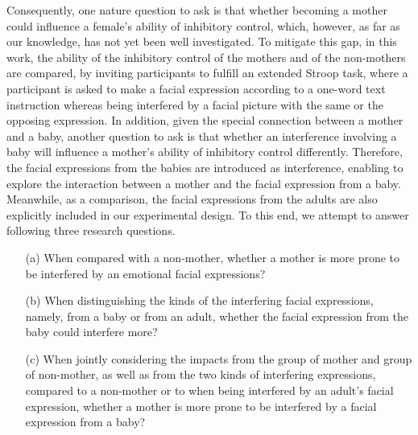 Consequently, 
one nature question to ask is that 
whether becoming a mother
could influence a female's ability of inhibitory
control, which, however, as far as our knowledge,
has not yet been well investigated.
To mitigate this gap,
in this work,
the ability of the inhibitory control of the mothers 
and of the non-mothers are compared, by inviting participants
to fulfill an extended Stroop task, where a participant is
asked to make a facial expression according to 
a one-word text instruction whereas being interfered
by a facial picture with the same or the opposing 
expression.
In addition,
given the special connection between a mother and a baby,
another question to ask is that whether an interference
involving a baby will influence a mother's ability of inhibitory
control differently.
Therefore,
the facial expressions from the babies are introduced
as interference, enabling to explore the interaction between a mother and the facial expression from a baby.
Meanwhile, as a comparison, the facial expressions from the adults
are also explicitly included in our experimental design.
To this end, 
we attempt to answer following
three research questions.
\begin{itemize}
\item[(a)] When compared with a non-mother, whether a mother is more prone to be interfered by an emotional facial expressions?
\item[(b)] When distinguishing the kinds of the
interfering facial expressions, namely, from a baby or from an adult,
whether the facial expression from the baby could interfere more?
\item[(c)] 
When jointly considering the impacts from the group of mother and group of non-mother, as well as from the two kinds of interfering expressions,
compared to a non-mother or to when being interfered by an adult's 
facial expression, 
whether a mother is more prone to be interfered by
a facial expression from a baby?
\end{itemize}

